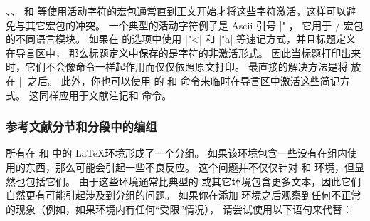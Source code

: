 、、 和  等使用活动字符的宏包通常直到正文开始才将这些字符激活，这样可以避免与其它宏包的冲突。
一个典型的活动字符例子是 Ascii 引号 |"|，
它用于 / 宏包的不同语言模块。
如果在  的选项中使用 |"<| 和 |"a| 等速记方式，并且标题定义在导言区中，
那么标题定义中保存的是字符的非激活形式。
因此当标题打印出来时，它们不会像命令一样起作用而仅仅依照原文打印。
最直接的解决方法是将  放在  || 之后。
此外，你也可以使用  的  和  命令来临时在导言区中激活这些简记方式。
这同样应用于文献注记和  命令。

\subsubsection{参考文献分节和分段中的编组}%
\label{use:cav:grp}


所有在  和  中的 \LaTeX 环境形成了一个分组。
如果该环境包含一些没有在组内使用的东西，那么可能会引起一些不良反应。
这个问题并不仅仅针对  和  环境，但显然也包括它们。
由于这些环境通常比典型的  或其它环境包含更多文本，因此它们自然更有可能引起涉及到分组的问题。
如果你在添加  环境之后观察到任何不正常的现象（例如，如果环境内有任何“受限”情况），
请尝试使用以下语句来代替：


